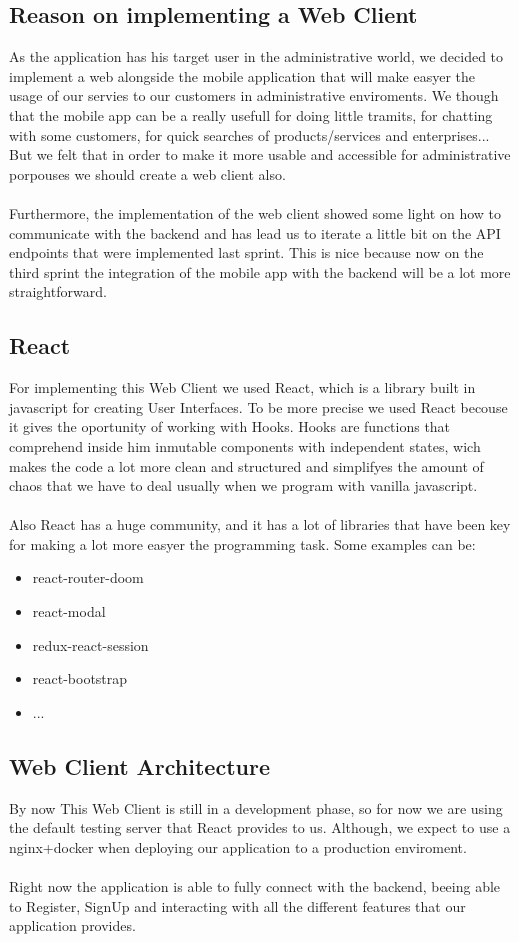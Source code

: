 \documentclass[./main.tex]{subfiles}
\begin{document}
\subsection{Reason on implementing a Web Client}
As the application has his target user in the 
administrative world, we decided to implement 
a web alongside the mobile application that will
make easyer the usage of our servies to our customers
in administrative enviroments. We though that the 
mobile app can be a really usefull for doing little 
tramits, for chatting with some customers, for 
quick searches of products/services and enterprises...\\
But we felt that in order to make it more usable and
accessible for administrative porpouses we should
create a web client also.
\\\\
Furthermore, the implementation of the web client 
showed some light on how to communicate with the backend
and has lead us to iterate a little bit on the API endpoints
that were implemented last sprint. This is nice because now
on the third sprint the integration of the mobile app with the 
backend will be a lot more straightforward.
\subsection{React}
For implementing this Web Client we used React, which is a 
library built in javascript for creating User Interfaces. 
To be more precise we used React becouse it gives the oportunity
of working with Hooks. Hooks are functions that comprehend inside him inmutable
components with independent states, wich makes the code a lot more
clean and structured and simplifyes the amount of chaos that we have
to deal usually when we program with vanilla javascript.
\\\\
Also React has a huge community, and it has a lot of libraries that
have been key for making a lot more easyer the programming task.
Some examples can be:
\begin{itemize}
	\item react-router-doom
	\item react-modal
	\item redux-react-session
	\item react-bootstrap
	\item ...
\end{itemize}
\subsection{Web Client Architecture}
By now This Web Client is still in a development phase, so for 
now we are using the default testing server that React provides to us.
Although, we expect to use a nginx+docker when deploying our application
to a production enviroment.
\\\\
Right now the application is able to fully connect with the backend,
beeing able to Register, SignUp and interacting with all the different 
features that our application provides.
\end{document}
